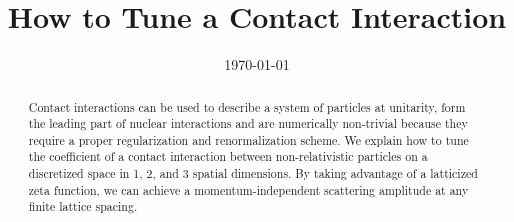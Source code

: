 \documentclass[aps,superscriptaddress,tightenlines,nofootinbib,floatfix,longbibliography,notitlepage]{revtex4-1}
\begin{document}
\title{How to Tune a Contact Interaction}





\date{\today}

\begin{abstract}
Contact interactions can be used to describe a system of particles at unitarity, form the leading part of nuclear interactions and are numerically non-trivial because they require a proper regularization and renormalization scheme.
We explain how to tune the coefficient of a contact interaction between non-relativistic particles on a discretized space in 1, 2, and 3 spatial dimensions.
By taking advantage of a latticized \Luscher zeta function, we can achieve a momentum-independent scattering amplitude at any finite lattice spacing.
\end{abstract}

\maketitle








% 



\appendix





\end{document}
